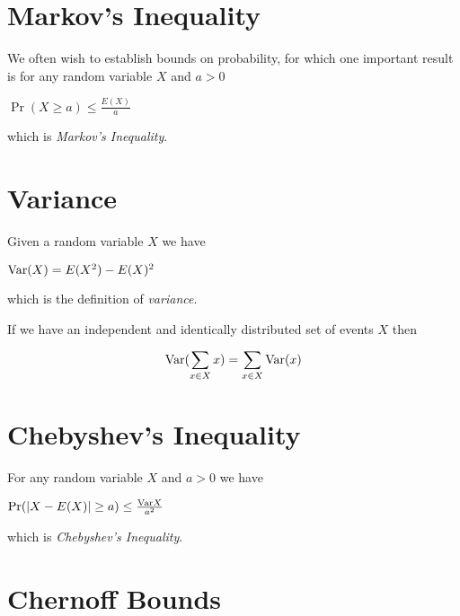 \section{Markov's Inequality}

We often wish to establish bounds on probability, for which one
important result is for any random variable $X$ and $a > 0$

\begin{center}
\begin{math}
  \Pr(X \geq a) \leq \frac{E(X)}{a}
\end{math}
\end{center}

which is \emph{Markov's Inequality}.

\section{Variance}

Given a random variable $X$ we have

\begin{center}
  \begin{math}
    \text{Var} (X) = E(X^2) - E(X)^2    
  \end{math}
\end{center}

which is the definition of \emph{variance}.

If we have an independent and identically distributed set of events
$X$ then

\begin{displaymath}
  \text{Var} (\sum_{x \in X} x) = \sum_{x \in X} \text{Var} (x)
\end{displaymath}

\section{Chebyshev's Inequality}

For any random variable $X$ and $a > 0$ we have

\begin{center}
  \begin{math}
    \text{Pr} ( | X - E(X) | \geq a ) \leq \frac{\text{Var}{X}}{a^2}
  \end{math}
\end{center}

which is \emph{Chebyshev's Inequality}.

\section{Chernoff Bounds}


